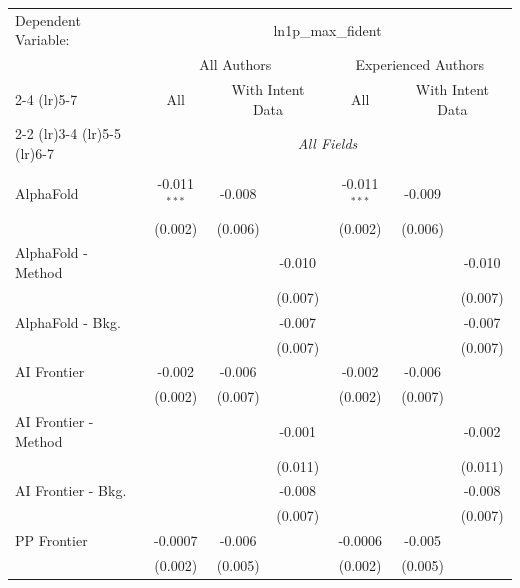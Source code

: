 \begingroup
\centering
\begin{tabular}{lcccccc}
   \tabularnewline \midrule \midrule
   Dependent Variable: & \multicolumn{6}{c}{ln1p\_max\_fident}\\
 & \multicolumn{3}{c}{All Authors} & \multicolumn{3}{c}{Experienced Authors} \\
\cmidrule(lr){2-4} \cmidrule(lr){5-7}
 & \multicolumn{1}{c}{All} & \multicolumn{2}{c}{With Intent Data} & \multicolumn{1}{c}{All} & \multicolumn{2}{c}{With Intent Data} \\
\cmidrule(lr){2-2} \cmidrule(lr){3-4} \cmidrule(lr){5-5} \cmidrule(lr){6-7}
 & \multicolumn{6}{c}{\textit{All Fields}} \\ \\
   AlphaFold            & -0.011$^{***}$ & -0.008  &         & -0.011$^{***}$ & -0.009  &   \\   
                        & (0.002)        & (0.006) &         & (0.002)        & (0.006) &   \\   
   AlphaFold - Method   &                &         & -0.010  &                &         & -0.010\\   
                        &                &         & (0.007) &                &         & (0.007)\\   
   AlphaFold - Bkg.     &                &         & -0.007  &                &         & -0.007\\   
                        &                &         & (0.007) &                &         & (0.007)\\   
   AI Frontier          & -0.002         & -0.006  &         & -0.002         & -0.006  &   \\   
                        & (0.002)        & (0.007) &         & (0.002)        & (0.007) &   \\   
   AI Frontier - Method &                &         & -0.001  &                &         & -0.002\\   
                        &                &         & (0.011) &                &         & (0.011)\\   
   AI Frontier - Bkg.   &                &         & -0.008  &                &         & -0.008\\   
                        &                &         & (0.007) &                &         & (0.007)\\   
   PP Frontier          & -0.0007        & -0.006  &         & -0.0006        & -0.005  &   \\   
                        & (0.002)        & (0.005) &         & (0.002)        & (0.005) &   \\   

\end{tabular}
